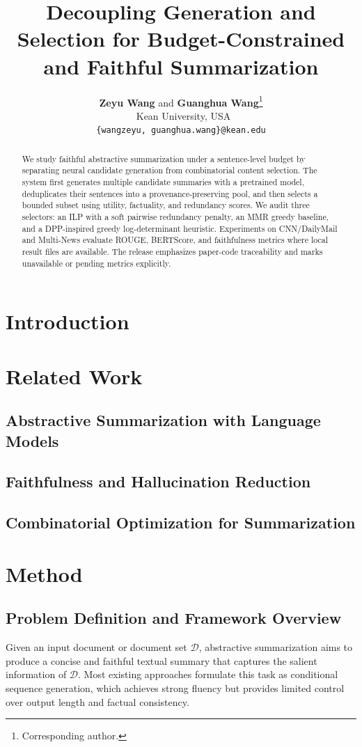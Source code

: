 \documentclass[11pt]{article}
\title{Decoupling Generation and Selection for Budget-Constrained and Faithful Summarization}
\author{
\textbf{Zeyu Wang} and
\textbf{Guanghua Wang}\thanks{Corresponding author.}
\\
\ Kean University, USA
\\
\small{
\texttt{\{wangzeyu, guanghua.wang\}@kean.edu}
}
}
\begin{document}
\maketitle
\begin{abstract}
We study faithful abstractive summarization under a sentence-level budget by separating neural candidate generation from combinatorial content selection. The system first generates multiple candidate summaries with a pretrained model, deduplicates their sentences into a provenance-preserving pool, and then selects a bounded subset using utility, factuality, and redundancy scores. We audit three selectors: an ILP with a soft pairwise redundancy penalty, an MMR greedy baseline, and a DPP-inspired greedy log-determinant heuristic. Experiments on CNN/DailyMail and Multi-News evaluate ROUGE, BERTScore, and faithfulness metrics where local result files are available. The release emphasizes paper-code traceability and marks unavailable or pending metrics explicitly.
\end{abstract}
\section{Introduction}
\section{Related Work}
\subsection{Abstractive Summarization with Language Models}
\subsection{Faithfulness and Hallucination Reduction}
\subsection{Combinatorial Optimization for Summarization}
\section{Method}

\subsection{Problem Definition and Framework Overview}

Given an input document or document set $\mathcal{D}$, abstractive summarization aims to produce a concise and faithful textual summary that captures the salient information of $\mathcal{D}$. Most existing approaches formulate this task as conditional sequence generation, which achieves strong fluency but provides limited control over output length and factual consistency.
\end{document}
